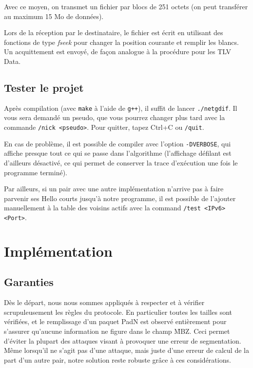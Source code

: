 \documentclass[11pt,a4paper]{article}
\begin{document}
Avec ce moyen, on transmet un fichier par blocs de 251 octets (on peut transférer au maximum 15 Mo de données). 

Lors de la réception par le destinataire, le fichier est écrit en utilisant des fonctions de type \emph{fseek} pour changer la position courante et remplir
les blancs. Un acquittement est envoyé, de façon analogue à la procédure pour les TLV Data.

\subsection{Tester le projet}

Après compilation (avec \texttt{make} à l'aide de \texttt{g++}), il suffit de lancer \texttt{./netgdif}. Il vous sera demandé un pseudo, que vous pourrez changer
plus tard avec la commande \texttt{/nick <pseudo>}.  Pour quitter, tapez Ctrl+C ou \texttt{/quit}.

En cas de problème, il est possible de compiler avec l'option \texttt{-DVERBOSE}, qui affiche presque tout ce qui se passe dans l'algorithme (l'affichage défilant 
est d'ailleurs désactivé, ce qui permet de conserver la trace d'exécution une fois le programme terminé).

Par ailleurs, si un pair avec une autre implémentation n'arrive pas à faire parvenir ses Hello courts jusqu'à notre programme, il est possible de l'ajouter
manuellement à la table des voisins actifs avec la command \texttt{/test <IPv6> <Port>}.

\section{Implémentation}

\subsection{Garanties}

Dès le départ, nous nous sommes appliqués à respecter et à vérifier scrupuleusement les règles du protocole. En particulier toutes les tailles sont vérifiées, et le remplissage
d'un paquet PadN est observé entièrement pour s'assurer qu'aucune information ne figure dans le champ \f{MBZ}. Ceci permet d'éviter la plupart des attaques visant à provoquer 
une erreur de segmentation. Même lorsqu'il ne s'agit pas d'une attaque, mais juste d'une erreur de calcul de la part d'un autre pair, notre solution reste robuste grâce à
ces considérations.
\end{document}
